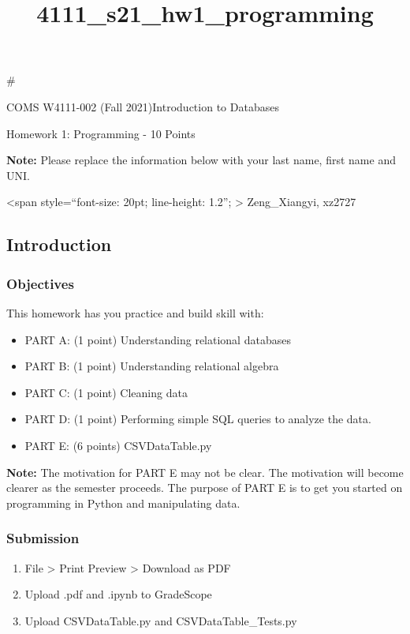 \documentclass[11pt]{article}
\title{4111\_s21\_hw1\_programming}
\providecommand{\tightlist}{%
      \setlength{\itemsep}{0pt}\setlength{\parskip}{0pt}}
\begin{document}
    
    \maketitle
    
    

    
    \#

{ COMS W4111-002 (Fall 2021)Introduction to Databases }

{ Homework 1: Programming - 10 Points }

    \textbf{Note:} Please replace the information below with your last name,
first name and UNI.

\textless span style=``font-size: 20pt; line-height: 1.2'';
\textgreater{} Zeng\_Xiangyi, xz2727

    \hypertarget{introduction}{%
\subsection{Introduction}\label{introduction}}

\hypertarget{objectives}{%
\subsubsection{Objectives}\label{objectives}}

This homework has you practice and build skill with:

\begin{itemize}
\tightlist
\item
  PART A: (1 point) Understanding relational databases
\item
  PART B: (1 point) Understanding relational algebra
\item
  PART C: (1 point) Cleaning data
\item
  PART D: (1 point) Performing simple SQL queries to analyze the data.
\item
  PART E: (6 points) CSVDataTable.py
\end{itemize}

\textbf{Note:} The motivation for PART E may not be clear. The
motivation will become clearer as the semester proceeds. The purpose of
PART E is to get you started on programming in Python and manipulating
data.

\hypertarget{submission}{%
\subsubsection{Submission}\label{submission}}

\begin{enumerate}
\def\labelenumi{\arabic{enumi}.}
\tightlist
\item
  File \textgreater{} Print Preview \textgreater{} Download as PDF
\item
  Upload .pdf and .ipynb to GradeScope
\item
  Upload CSVDataTable.py and CSVDataTable\_Tests.py
\end{enumerate}
\end{document}
